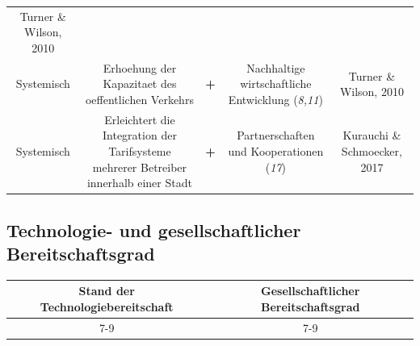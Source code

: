 \documentclass[
]{book}
\begin{document}
\begin{longtable}[]{@{}ccccc@{}}
\begin{minipage}[t]{0.17\columnwidth}
Turner \& Wilson, 2010\strut
\end{minipage}\tabularnewline
\begin{minipage}[t]{0.17\columnwidth}\centering
Systemisch\strut
\end{minipage} & \begin{minipage}[t]{0.16\columnwidth}\centering
Erhoehung der Kapazitaet des oeffentlichen Verkehrs\strut
\end{minipage} & \begin{minipage}[t]{0.17\columnwidth}\centering
\textbf{+}\strut
\end{minipage} & \begin{minipage}[t]{0.17\columnwidth}\centering
Nachhaltige wirtschaftliche Entwicklung (\emph{8,11})\strut
\end{minipage} & \begin{minipage}[t]{0.17\columnwidth}\centering
Turner \& Wilson, 2010\strut
\end{minipage}\tabularnewline
\begin{minipage}[t]{0.17\columnwidth}\centering
Systemisch\strut
\end{minipage} & \begin{minipage}[t]{0.16\columnwidth}\centering
Erleichtert die Integration der Tarifsysteme mehrerer Betreiber innerhalb einer Stadt\strut
\end{minipage} & \begin{minipage}[t]{0.17\columnwidth}\centering
\textbf{+}\strut
\end{minipage} & \begin{minipage}[t]{0.17\columnwidth}\centering
Partnerschaften und Kooperationen (\emph{17})\strut
\end{minipage} & \begin{minipage}[t]{0.17\columnwidth}\centering
Kurauchi \& Schmoecker, 2017\strut
\end{minipage}\tabularnewline
\bottomrule
\end{longtable}

\hypertarget{technologie--und-gesellschaftlicher-bereitschaftsgrad-23}{%
\subsection*{Technologie- und gesellschaftlicher Bereitschaftsgrad}\label{technologie--und-gesellschaftlicher-bereitschaftsgrad-23}}

\begin{longtable}[]{@{}cc@{}}
\toprule
Stand der Technologiebereitschaft & Gesellschaftlicher Bereitschaftsgrad\tabularnewline
\midrule
\endhead
7-9 & 7-9\tabularnewline
\bottomrule
\end{longtable}
\end{document}
